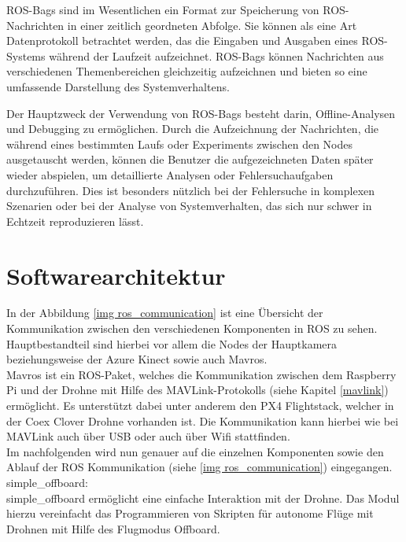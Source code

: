 \begin{description}
    ROS-Bags sind im Wesentlichen ein Format zur Speicherung von \ac{ROS}-Nachrichten in einer zeitlich geordneten Abfolge. Sie können als eine Art Datenprotokoll betrachtet werden, das die Eingaben und Ausgaben eines \ac{ROS}-Systems während der Laufzeit aufzeichnet. ROS-Bags können Nachrichten aus verschiedenen Themenbereichen gleichzeitig aufzeichnen und bieten so eine umfassende Darstellung des Systemverhaltens.
    
    Der Hauptzweck der Verwendung von ROS-Bags besteht darin, Offline-Analysen und Debugging zu ermöglichen. Durch die Aufzeichnung der Nachrichten, die während eines bestimmten Laufs oder Experiments zwischen den Nodes ausgetauscht werden, können die Benutzer die aufgezeichneten Daten später wieder abspielen, um detaillierte Analysen oder Fehlersuchaufgaben durchzuführen. Dies ist besonders nützlich bei der Fehlersuche in komplexen Szenarien oder bei der Analyse von Systemverhalten, das sich nur schwer in Echtzeit reproduzieren lässt.

    \cite[vgl.][]{ros-bags}
\end{description}

\section{Softwarearchitektur} \label{softwarearchitektur:section}

In der Abbildung \ref{img ros_communication} ist eine Übersicht der Kommunikation zwischen den verschiedenen Komponenten in \ac{ROS} zu sehen. \\
Hauptbestandteil sind hierbei vor allem die Nodes der Hauptkamera beziehungsweise der Azure Kinect sowie auch Mavros. \\
Mavros ist ein ROS-Paket, welches die Kommunikation zwischen dem Raspberry Pi und der Drohne mit Hilfe des MAVLink-Protokolls (siehe Kapitel \ref{mavlink}) ermöglicht. Es unterstützt dabei unter anderem den PX4 Flightstack, welcher in der Coex Clover Drohne vorhanden ist. Die Kommunikation kann hierbei wie bei MAVLink auch über \ac{USB} oder auch über Wifi stattfinden. \cite[vgl.][]{mavros}\\
Im nachfolgenden wird nun genauer auf die einzelnen Komponenten sowie den Ablauf der ROS Kommunikation (siehe \ref{img ros_communication}) eingegangen. \\

simple\_offboard: \\
simple\_offboard ermöglicht eine einfache Interaktion mit der Drohne. Das Modul hierzu vereinfacht das Programmieren von Skripten für autonome Flüge mit Drohnen mit Hilfe des Flugmodus Offboard. \cite[vgl.][]{simple_offboard}\\

